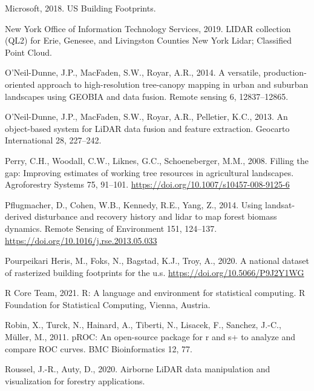 \documentclass[]{elsarticle} %
\newlength{\cslhangindent}
\newenvironment{CSLReferences}[2] %
 {%
  \setlength{\parindent}{0pt}
  \ifodd #1 \everypar{\setlength{\hangindent}{\cslhangindent}}\ignorespaces\fi
  \ifnum #2 > 0
  \setlength{\parskip}{#2\baselineskip}
  \fi
 }%
 {}
\begin{document}
\begin{CSLReferences}{1}{0}
\leavevmode{}%
Microsoft, 2018. {US Building Footprints.}

\leavevmode{}%
New York Office of Information Technology Services, 2019. {LIDAR collection (QL2) for Erie, Genesee, and Livingston Counties New York Lidar; Classified Point Cloud}.

\leavevmode{}%
O'Neil-Dunne, J.P., MacFaden, S.W., Royar, A.R., 2014. A versatile, production-oriented approach to high-resolution tree-canopy mapping in urban and suburban landscapes using GEOBIA and data fusion. Remote sensing 6, 12837--12865.

\leavevmode{}%
O'Neil-Dunne, J.P., MacFaden, S.W., Royar, A.R., Pelletier, K.C., 2013. An object-based system for LiDAR data fusion and feature extraction. Geocarto International 28, 227--242.

\leavevmode{}%
Perry, C.H., Woodall, C.W., Liknes, G.C., Schoeneberger, M.M., 2008. Filling the gap: Improving estimates of working tree resources in agricultural landscapes. Agroforestry Systems 75, 91--101. \url{https://doi.org/10.1007/s10457-008-9125-6}

\leavevmode{}%
Pflugmacher, D., Cohen, W.B., Kennedy, R.E., Yang, Z., 2014. Using landsat-derived disturbance and recovery history and lidar to map forest biomass dynamics. Remote Sensing of Environment 151, 124--137. \url{https://doi.org/10.1016/j.rse.2013.05.033}

\leavevmode{}%
Pourpeikari Heris, M., Foks, N., Bagstad, K.J., Troy, A., 2020. A national dataset of rasterized building footprints for the u.s. \url{https://doi.org/10.5066/P9J2Y1WG}

\leavevmode{}%
R Core Team, 2021. R: A language and environment for statistical computing. R Foundation for Statistical Computing, Vienna, Austria.

\leavevmode{}%
Robin, X., Turck, N., Hainard, A., Tiberti, N., Lisacek, F., Sanchez, J.-C., Müller, M., 2011. pROC: An open-source package for r and s+ to analyze and compare ROC curves. BMC Bioinformatics 12, 77.

\leavevmode{}%
Roussel, J.-R., Auty, D., 2020. Airborne LiDAR data manipulation and visualization for forestry applications.


\end{CSLReferences}
\end{document}
